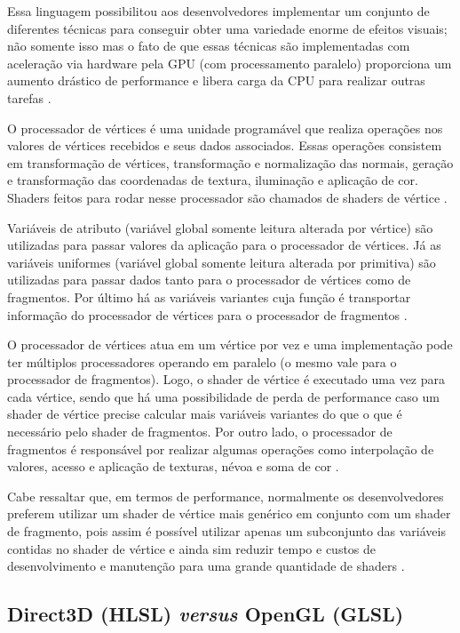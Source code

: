 Essa linguagem possibilitou aos desenvolvedores implementar um conjunto de diferentes técnicas para conseguir obter uma variedade enorme de efeitos visuais; não somente isso mas o fato de que essas técnicas são implementadas com aceleração via hardware pela GPU (com processamento paralelo) proporciona um aumento drástico de performance e libera carga da CPU para realizar outras tarefas \cite{GLSLBook}.

O processador de vértices é uma unidade programável que realiza operações nos valores de vértices recebidos e seus dados associados. Essas operações consistem em transformação de vértices, transformação e normalização das normais, geração e transformação das coordenadas de textura, iluminação e aplicação de cor. Shaders feitos para rodar nesse processador são chamados de shaders de vértice \cite{GLSLBook}. 

Variáveis de atributo (variável global somente leitura alterada por vértice) são utilizadas para passar valores da aplicação para o processador de vértices. Já as variáveis uniformes (variável global somente leitura alterada por primitiva) são utilizadas para passar dados tanto para o processador de vértices como de fragmentos. Por último há as variáveis variantes cuja função é transportar informação do processador de vértices para o processador de fragmentos \cite{GLSLBook}.

O processador de vértices atua em um vértice por vez e uma implementação pode ter múltiplos processadores operando em paralelo (o mesmo vale para o processador de fragmentos). Logo, o shader de vértice é executado uma vez para cada vértice, sendo que há uma possibilidade de perda de performance caso um shader de vértice precise calcular mais variáveis variantes do que o que é necessário pelo shader de fragmentos. Por outro lado, o processador de fragmentos é responsável por realizar algumas operações como interpolação de valores, acesso e aplicação de texturas, névoa e soma de cor \cite{GLSLBook}. 

Cabe ressaltar que, em termos de performance, normalmente os desenvolvedores preferem utilizar um shader de vértice mais genérico em conjunto com um shader de fragmento, pois assim é possível utilizar apenas um subconjunto das variáveis contidas no shader de vértice e ainda sim reduzir tempo e custos de desenvolvimento e manutenção para uma grande quantidade de shaders \cite{GLSLBook}.

\subsection{Direct3D (HLSL) \textit{versus} OpenGL (GLSL)}
\label{sec:direct-versus-opengl}


